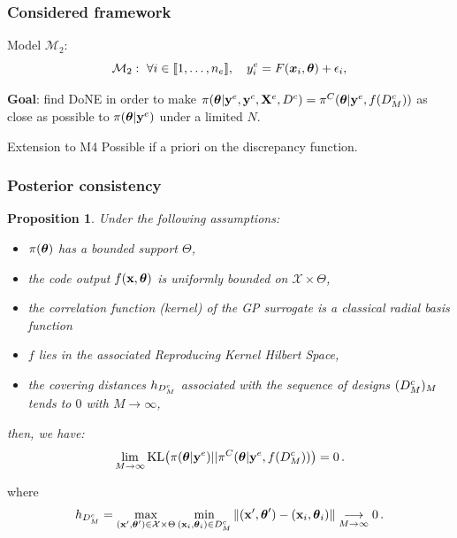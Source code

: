 \documentclass[nopagenumber,9pt]{beamer}
\newtheorem{Prop}{Proposition}
\begin{document}
\begin{frame}
 \frametitle{Considered framework}
 
 Model $\mathcal{M}_2$:
$$\mathcal{M}_2  : \ \forall i \in \llbracket1,\dots,n_e\rrbracket, \quad y^{e}_i = F(\boldsymbol{x}_i,\boldsymbol{\theta}) + \epsilon_i,$$
 
 \bigskip
 
 \textbf{Goal}: find DoNE in order to make $\pi(\boldsymbol{\theta}|\mathbf{y}^{e},\mathbf{y}^c,\mathbf{X}^e,D^c)=\pi^{C}(\boldsymbol{\theta}|\mathbf{y}^{e},f(D^c_M))$ as close as possible to $\pi(\boldsymbol{\theta}|\mathbf{y}^{e})$ under a limited $N$.
 
 
 \bigskip
 
 \begin{beamerboxesrounded}{Extension to M4}
  Possible if a priori on the discrepancy function.
 \end{beamerboxesrounded}

\end{frame}


 \begin{frame}
 \frametitle{Posterior consistency}
 \begin{Prop}
\label{PropKL}
Under the following assumptions:
\begin{itemize}
\item $\pi(\boldsymbol{\theta})$ has a bounded support $\Theta$, 
\item the code output $f(\textbf{x},\boldsymbol{\theta})$ is uniformly bounded on $\mathcal{X}\times\Theta$,
\item the correlation function (kernel) of the GP surrogate is a classical radial basis function %
\item $f$ lies in the associated Reproducing Kernel Hilbert Space,
\item the covering distances $h_{D^c_M}$ associated with the sequence of designs $(D^c_M)_M$ tends to $0$ with $M\rightarrow\infty$,
\end{itemize}
then, we have:
 \begin{equation*}
\label{robust}
\lim_{M\to\infty}\textrm{KL}\big(\pi(\boldsymbol{\theta}|\mathbf{y}^{e})||\pi^{C}(\boldsymbol{\theta}|\mathbf{y}^{e},f(D^c_M))\big)=0\,.
\end{equation*}
\end{Prop}
 
 \medskip
 
 
 where
 \begin{equation*}
h_{D^c_M}=\max_{(\mathbf{x}',\boldsymbol{\theta}')\in\mathcal{X}\times \Theta}\min_{(\mathbf{x}_i,\boldsymbol{\theta}_i)\in D^c_M}\Vert 
(\mathbf{x}',\boldsymbol{\theta}')-(\mathbf{x}_i,\boldsymbol{\theta}_i)\Vert\underset{M\to\infty}\longrightarrow 0 \,.
\end{equation*}
 
 
\end{frame}
\end{document}
